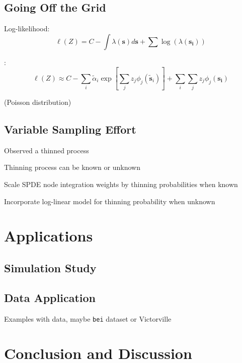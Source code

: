 \documentclass[]{interact}
\begin{document}
\subsection{Going Off the Grid}

Log-likelihood:
\begin{displaymath}
\ell(Z) = C - \int \lambda(\mathbf{s}) d\mathbf{s}
+ \sum \log\left(\lambda(\mathbf{s_{i}})\right)
\end{displaymath}

\cite{simpsonetal}:
$$\ell(Z) \approx C - \sum_{i} \tilde{\alpha}_{i} \exp\left[\sum_{j} z_{j}\phi_{j}(\tilde{\mathbf{s}}_{i})\right] + \sum_{i} \sum_{j} z_{j}\phi_{j}(\mathbf{s_{i}})$$

(Poisson distribution)


\subsection{Variable Sampling Effort}

Observed a thinned process

Thinning process can be known or unknown

Scale SPDE node integration weights by thinning probabilities when known

Incorporate log-linear model for thinning probability when unknown \cite{yuanetal}


\section{Applications}


\subsection{Simulation Study}


\subsection{Data Application}

Examples with data, maybe \texttt{bei} dataset or Victorville


\section{Conclusion and Discussion}
\end{document}
